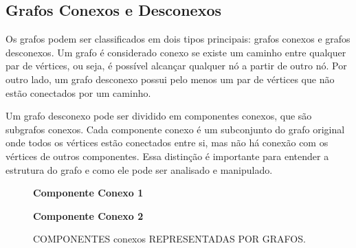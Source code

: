 \subsection{Grafos Conexos e Desconexos}

Os grafos podem ser classificados em dois tipos principais: grafos conexos e grafos desconexos. Um grafo é considerado conexo se existe um caminho entre qualquer par de vértices, ou seja, é possível alcançar qualquer nó a partir de outro nó. Por outro lado, um grafo desconexo possui pelo menos um par de vértices que não estão conectados por um caminho.

Um grafo desconexo pode ser dividido em componentes conexos, que são subgrafos conexos. Cada componente conexo é um subconjunto do grafo original onde todos os vértices estão conectados entre si, mas não há conexão com os vértices de outros componentes. Essa distinção é importante para entender a estrutura do grafo e como ele pode ser analisado e manipulado.


\begin{figure}[ht]
    \caption{COMPONENTES conexos REPRESENTADAS POR GRAFOS.}
    \centering
    \begin{minipage}{0.45\textwidth}
        \centering
        \textbf{Componente Conexo 1} \\[0.2cm]
    \end{minipage}
    \hfill
    \begin{minipage}{0.45\textwidth}
        \centering
        \textbf{Componente Conexo 2} \\[0.2cm]
    \end{minipage}
    \label{fig:componentes_conexos}
    \end{figure}


